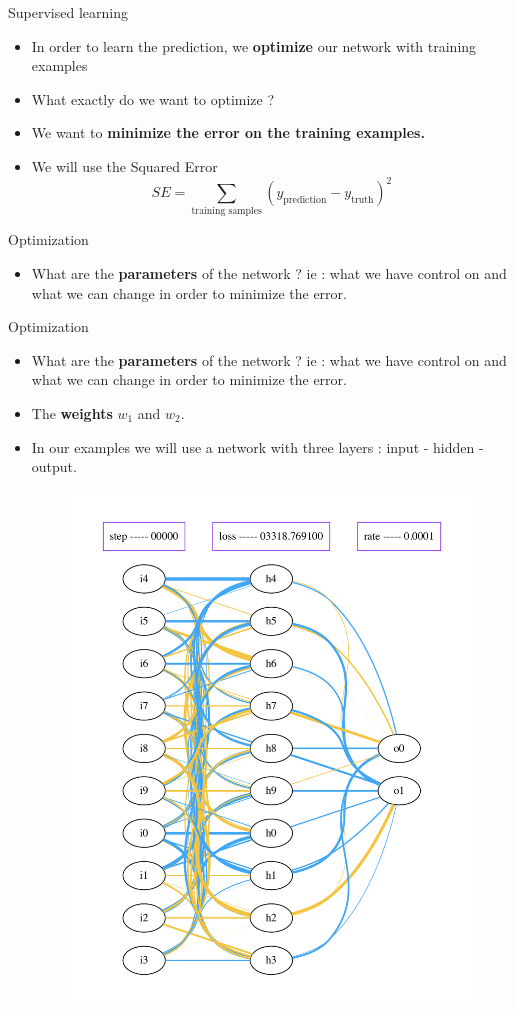 \documentclass{beamer}
\begin{document}
\begin{frame}{Supervised learning}
    \begin{itemize}
        \item In order to learn the prediction, we \textbf{{optimize}} our
            network with training examples
        \item What exactly do we want to optimize ?
        \item We want to \textbf{minimize the error on the training examples.}
        \item We will use the Squared Error
            \begin{equation}
              SE =   \sum_{\text{training
                samples}}(y_{\text{prediction}}-y_{\text{truth}})^2
            \end{equation}
    \end{itemize}
\end{frame}

\begin{frame}{Optimization}
    \begin{itemize}
        \item What are the \textbf{{parameters}}  of the network  ? ie : what
            we have control on and what we can change in order to minimize the
            error.
    \end{itemize}
\end{frame}


\begin{frame}{Optimization}
    \begin{itemize}
        \item What are the \textbf{{parameters}}  of the network  ? ie : what
            we have control on and what we can change in order to minimize the
            error.
        \item The \textbf{{weights}} $w_1$ and $w_2$.
        \item In our examples we will use a network with three layers : input -
            hidden - output.
            \begin{figure}[htpb]
                \centering
                \includegraphics[width=0.3\linewidth]{net_0}
                \label{fig:name}
            \end{figure}
    \end{itemize}
\end{frame}
\end{document}
